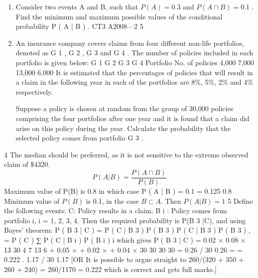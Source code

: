 \documentclass[a4paper,12pt]{article}
\begin{document}
\begin{enumerate}
\item Consider two events A and B, such that $P ( A ) = 0.3$ and $P ( A \cap B ) = 0.1$ .
Find the minimum and maximum possible values of the conditional probability
P ( A | B ) .
CT3 A2008—2
5
\item An insurance company covers claims from four different non-life portfolios, denoted as G 1 , G 2 , G 3 and G 4 . The number of policies included in each portfolio is given
below:
G 1
G 2
G 3
G 4
Portfolio
No. of policies 4,000 7,000 13,000 6,000
It is estimated that the percentages of policies that will result in a claim in the following year in each of the portfolios are 8\%, 5\%, 2\% and 4\% respectively.

Suppose a policy is chosen at random from the group of 30,000 policies comprising the four portfolios after one year and it is found that a claim did arise on this policy during the year. Calculate the probability that the selected policy comes from
portfolio G 3 .
\end{enumerate}
\newpage
4
The median should be preferred, as it is not sensitive to the extreme observed
claim of \$4320.
\[P ( A | B ) = \frac{P ( A \cap B )}{P ( B )}\]
Maximum value of P(B) is 0.8 in which case P ( A | B ) =
0.1
= 0.125
0.8
Minimum value of $P(B)$ is 0.1, in the case $B \subset A$. Then $P ( A | B ) = 1$
5
Define the following events:
C: Policy results in a claim;
B i : Policy comes from portfolio i, i = 1, 2, 3, 4.
Then the required probability is P(B 3 |C), and using Bayes’ theorem:
P ( B 3 | C ) =
P ( C | B 3 ) P ( B 3 )
P ( C | B 3 ) P ( B 3 )
,
=
P ( C )
∑ P ( C | B i ) P ( B i )
i
which gives
P ( B 3 | C ) =
0.02 ×
0.08 ×
13
30
4
7
13
6
+ 0.05 × + 0.02 × + 0.04 ×
30
30
30
30
=
0.26 / 30 0.26
=
= 0.222 .
1.17 / 30 1.17
[OR It is possible to argue straight to
260/(320 + 350 + 260 + 240) = 260/1170 = 0.222
which is correct and gets full marks.]
\end{document}
